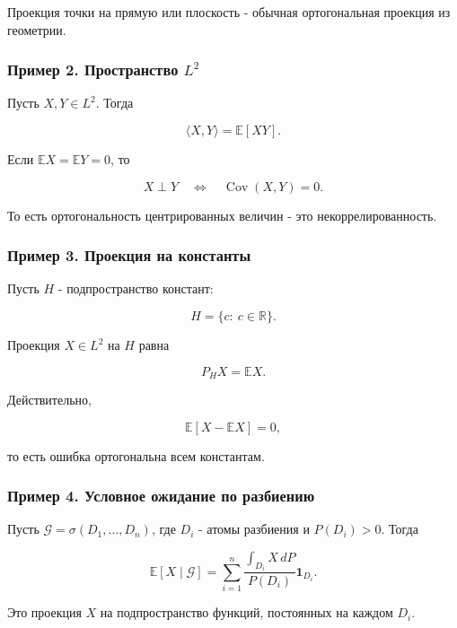 \documentclass[
  11pt,
  a4paper,
]{article}
\begin{document}
Проекция точки на прямую или плоскость - обычная ортогональная проекция
из геометрии.

\subsubsection{\texorpdfstring{Пример 2. Пространство
\(L^2\)}{Пример 2. Пространство L\^{}2}}\label{ux43fux440ux438ux43cux435ux440-2.-ux43fux440ux43eux441ux442ux440ux430ux43dux441ux442ux432ux43e-l2}

Пусть \(X,Y\in L^2\). Тогда

\[
\langle X,Y\rangle=\mathbb E[XY].
\]

Если \(\mathbb EX=\mathbb EY=0\), то

\[
X\perp Y
\quad\Longleftrightarrow\quad
\operatorname{Cov}(X,Y)=0.
\]

То есть ортогональность центрированных величин - это
некоррелированность.

\subsubsection{Пример 3. Проекция на
константы}\label{ux43fux440ux438ux43cux435ux440-3.-ux43fux440ux43eux435ux43aux446ux438ux44f-ux43dux430-ux43aux43eux43dux441ux442ux430ux43dux442ux44b}

Пусть \(H\) - подпространство констант:

\[
H=\{c:\ c\in\mathbb R\}.
\]

Проекция \(X\in L^2\) на \(H\) равна

\[
P_HX=\mathbb EX.
\]

Действительно,

\[
\mathbb E[X-\mathbb EX]=0,
\]

то есть ошибка ортогональна всем константам.

\subsubsection{Пример 4. Условное ожидание по
разбиению}\label{ux43fux440ux438ux43cux435ux440-4.-ux443ux441ux43bux43eux432ux43dux43eux435-ux43eux436ux438ux434ux430ux43dux438ux435-ux43fux43e-ux440ux430ux437ux431ux438ux435ux43dux438ux44e}

Пусть \(\mathcal G=\sigma(D_1,\ldots,D_n)\), где \(D_i\) - атомы
разбиения и \(P(D_i)>0\). Тогда

\[
\mathbb E[X\mid\mathcal G]
=
\sum_{i=1}^n
\frac{\int_{D_i}X\,dP}{P(D_i)}\mathbf 1_{D_i}.
\]

Это проекция \(X\) на подпространство функций, постоянных на каждом
\(D_i\).
\end{document}
